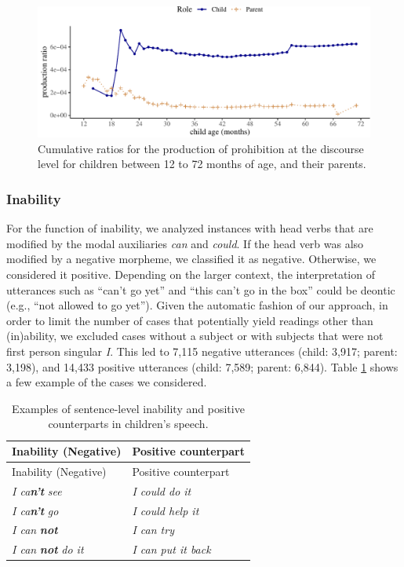 \documentclass[
  english,
  man,floatsintext]{apa6}
\begin{document}
\begin{figure}[H]

{\centering \includegraphics{neg_construction_article_files/figure-latex/prohibitiondiscourse-1} 

}

\caption{Cumulative ratios for the production of prohibition at the discourse level for children between 12 to 72 months of age, and their parents.}\label{fig:prohibitiondiscourse}
\end{figure}

\hypertarget{inability}{%
\subsubsection{Inability}\label{inability}}

For the function of inability, we analyzed instances with head verbs that are modified by the modal auxiliaries \emph{can} and \emph{could}. If the head verb was also modified by a negative morpheme, we classified it as negative. Otherwise, we considered it positive. Depending on the larger context, the interpretation of utterances such as ``can't go yet'' and ``this can't go in the box'' could be deontic (e.g., ``not allowed to go yet''). Given the automatic fashion of our approach, in order to limit the number of cases that potentially yield readings other than (in)ability, we excluded cases without a subject or with subjects that were not first person singular \emph{I}. This led to 7,115 negative utterances (child: 3,917; parent: 3,198), and 14,433 positive utterances (child: 7,589; parent: 6,844). Table \ref{tab:inab} shows a few example of the cases we considered.

\begin{longtable}[]{@{}ll@{}}
\caption{\label{tab:inab} Examples of sentence-level inability and positive counterparts in children's speech.}\tabularnewline
\toprule
Inability (Negative) & Positive counterpart \\
\midrule
\endfirsthead
\toprule
Inability (Negative) & Positive counterpart \\
\midrule
\endhead
\emph{I ca}\textbf{\emph{n't}} \emph{see} & \emph{I could do it} \\
\emph{I ca}\textbf{\emph{n't}} \emph{go} & \emph{I could help it} \\
\emph{I can} \textbf{\emph{not}} & \emph{I can try} \\
\emph{I can} \textbf{\emph{not}} \emph{do it} & \emph{I can put it back} \\
\bottomrule
\end{longtable}
\end{document}
